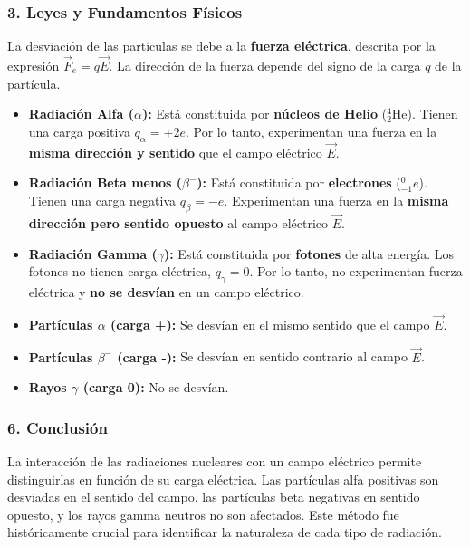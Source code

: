 \subsubsection*{3. Leyes y Fundamentos Físicos}
La desviación de las partículas se debe a la \textbf{fuerza eléctrica}, descrita por la expresión $\vec{F}_e = q\vec{E}$. La dirección de la fuerza depende del signo de la carga $q$ de la partícula.
\begin{itemize}
    \item \textbf{Radiación Alfa ($\alpha$):} Está constituida por \textbf{núcleos de Helio} (${}_{2}^{4}\text{He}$). Tienen una carga positiva $q_{\alpha} = +2e$. Por lo tanto, experimentan una fuerza en la \textbf{misma dirección y sentido} que el campo eléctrico $\vec{E}$.
    \item \textbf{Radiación Beta menos ($\beta^{-}$):} Está constituida por \textbf{electrones} (${}_{-1}^{0}e$). Tienen una carga negativa $q_{\beta} = -e$. Experimentan una fuerza en la \textbf{misma dirección pero sentido opuesto} al campo eléctrico $\vec{E}$.
    \item \textbf{Radiación Gamma ($\gamma$):} Está constituida por \textbf{fotones} de alta energía. Los fotones no tienen carga eléctrica, $q_{\gamma}=0$. Por lo tanto, no experimentan fuerza eléctrica y \textbf{no se desvían} en un campo eléctrico.
\end{itemize}

\begin{cajaresultado}
\begin{itemize}
    \item \textbf{Partículas $\alpha$ (carga +):} Se desvían en el mismo sentido que el campo $\vec{E}$.
    \item \textbf{Partículas $\beta^{-}$ (carga -):} Se desvían en sentido contrario al campo $\vec{E}$.
    \item \textbf{Rayos $\gamma$ (carga 0):} No se desvían.
\end{itemize}
\end{cajaresultado}

\subsubsection*{6. Conclusión}
\begin{cajaconclusion}
La interacción de las radiaciones nucleares con un campo eléctrico permite distinguirlas en función de su carga eléctrica. Las partículas alfa positivas son desviadas en el sentido del campo, las partículas beta negativas en sentido opuesto, y los rayos gamma neutros no son afectados. Este método fue históricamente crucial para identificar la naturaleza de cada tipo de radiación.
\end{cajaconclusion}
\newpage

